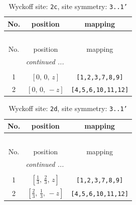 \documentclass[fleqn,8pt]{jsarticle}
\begin{document}
\begin{longtable}{ccc}
\caption{Wyckoff site: {\tt 2c}, site symmetry: {\tt 3..1'}}
 \\
 \hline \hline
No. & position & mapping \\ \hline \endfirsthead

\multicolumn{2}{l}{\tablename\ \thetable{}} \\
 \hline \hline
No. & position & mapping \\ \hline \endhead

 \hline \hline
\multicolumn{2}{r}{\footnotesize\it continued ...} \\ \endfoot

 \hline \hline
\multicolumn{2}{r}{} \\ \endlastfoot

1 & $\left[ 0,\, 0,\, z \right]$ & {\tt [1,2,3,7,8,9]} \\ \hline
2 & $\left[ 0,\, 0,\, - z \right]$ & {\tt [4,5,6,10,11,12]} \\
\end{longtable}
\renewcommand{\arraystretch}{1.2}
\begin{longtable}{ccc}
\caption{Wyckoff site: {\tt 2d}, site symmetry: {\tt 3..1'}}
 \\
 \hline \hline
No. & position & mapping \\ \hline \endfirsthead

\multicolumn{2}{l}{\tablename\ \thetable{}} \\
 \hline \hline
No. & position & mapping \\ \hline \endhead

 \hline \hline
\multicolumn{2}{r}{\footnotesize\it continued ...} \\ \endfoot

 \hline \hline
\multicolumn{2}{r}{} \\ \endlastfoot

1 & $\left[ \frac{1}{3},\, \frac{2}{3},\, z \right]$ & {\tt [1,2,3,7,8,9]} \\ \hline
2 & $\left[ \frac{2}{3},\, \frac{1}{3},\, - z \right]$ & {\tt [4,5,6,10,11,12]} \\
\end{longtable}
\renewcommand{\arraystretch}{1.2}
\end{document}
